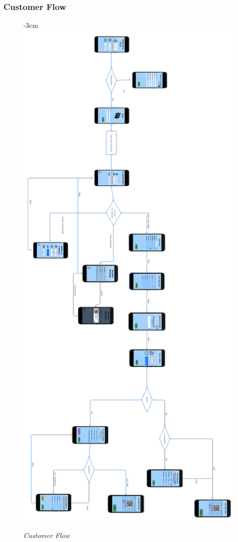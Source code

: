 \documentclass{article}
\begin{document}
		\subsubsection{Customer Flow}
			\begin{figure}[H]
				\begin{adjustwidth} {-3cm}{}
					\centering
					\includegraphics[scale=0.7, angle=180, trim= 0 0 0 -5cm]{../Mockups/UXDiagrams/CustomerFlow.pdf} \\
				\end{adjustwidth}
				\caption{\emph{Customer Flow}}
			\end{figure}
\end{document}

